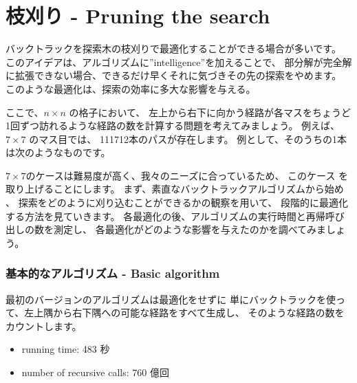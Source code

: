 \section{枝刈り - Pruning the search}

バックトラックを探索木の枝刈りで最適化することができる場合が多いです。
このアイデアは、アルゴリズムに''intelligence''を加えることで、
部分解が完全解に拡張できない場合、できるだけ早くそれに気づきその先の探索をやめます。
このような最適化は、探索の効率に多大な影響を与える。

ここで、$n \times n$ の格子において、
左上から右下に向かう経路が各マスをちょうど1回ずつ訪れるような経路の数を計算する問題を考えてみましょう。
例えば、$7 \times 7$ のマス目では、
111712本のパスが存在します。
例として、そのうちの1本は次のようなものです。

\begin{center}
\end{center}

$7 \times 7$のケースは難易度が高く、我々のニーズに合っているため、
このケース を取り上げることにします。
まず、素直なバックトラックアルゴリズムから始め 、
探索をどのように刈り込むことができるかの観察を用いて、
段階的に最適化する方法を見ていきます。
各最適化の後、アルゴリズムの実行時間と再帰呼び出しの数を測定し、
各最適化がどのような影響を与えたのかを調べてみましょう。

\subsubsection{基本的なアルゴリズム - Basic algorithm}

最初のバージョンのアルゴリズムは最適化をせずに
単にバックトラックを使って、左上隅から右下隅への可能な経路をすべて生成し、
そのような経路の数をカウントします。

\begin{itemize}
\item
running time: 483 秒
\item
number of recursive calls: 760 億回
\end{itemize}

